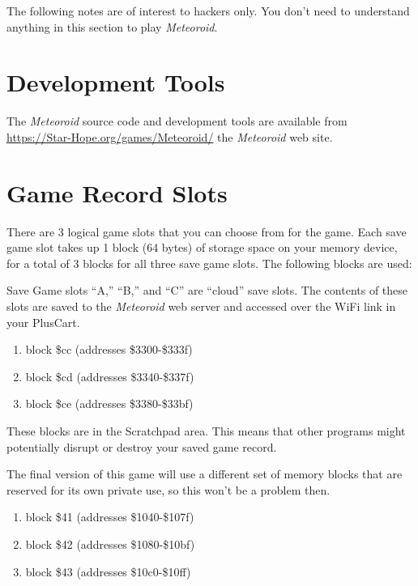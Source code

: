 \documentclass[10pt,twocolumn,openany,article]{memoir}
\begin{document}
The following notes are of interest to hackers only. You don't need to
understand anything in this section to play \textit{Meteoroid}.

\section{Development Tools}

The \textit{Meteoroid} source code and development tools are available from
\href{https://Star-Hope.org/games/Meteoroid/}{https://Star-Hope\-.org/\-games/\-Meteoroid/} 
the \textit{Meteoroid} web site.

\section{Game Record Slots}

There are 3  logical game slots that  you can choose from  for the game.
Each save game slot takes up 1 block (64 bytes) of storage space on your
memory device, for  a total of 3  blocks for all three  save game slots.
The following blocks are used:

\ifdefined\PLUSCART

Save  Game slots  ``A,''  ``B,''  and ``C''  are  ``cloud'' save  slots.
The  contents of  these slots  are saved  to the  \textit{Meteoroid} web
server and accessed over the WiFi link in your PlusCart.

\fi

\ifdefined\DEMO

\begin{enumerate}
\item block \$cc (addresses \$3300-\$333f)
\item block \$cd (addresses \$3340-\$337f)
\item block \$ce (addresses \$3380-\$33bf)
\end{enumerate}

These blocks are in the Scratchpad  area. This means that other programs
might potentially disrupt or destroy your saved game record.

The final version of this game will use a different set of memory blocks
that  are  reserved   for  its  own  private  use,  so   this  won't  be
a problem then.

\else

\begin{enumerate}
\item block \$41 (addresses \$1040-\$107f)
\item block \$42 (addresses \$1080-\$10bf)
\item block \$43 (addresses \$10c0-\$10ff)
\end{enumerate}
\end{document}

